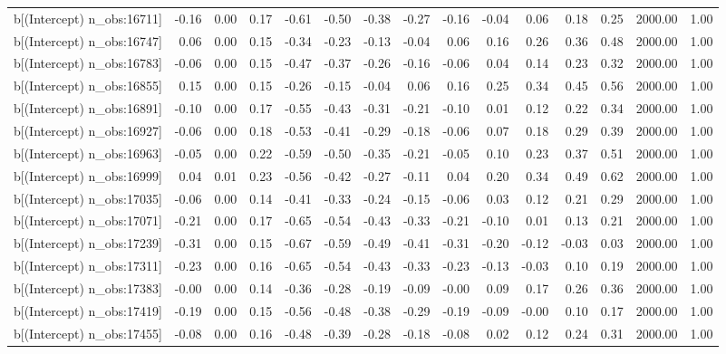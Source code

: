 \begin{table}[ht]
\begin{tabular}{rrrrrrrrrrrrrrr}
  b[(Intercept) n\_obs:16711] & -0.16 & 0.00 & 0.17 & -0.61 & -0.50 & -0.38 & -0.27 & -0.16 & -0.04 & 0.06 & 0.18 & 0.25 & 2000.00 & 1.00 \\ 
  b[(Intercept) n\_obs:16747] & 0.06 & 0.00 & 0.15 & -0.34 & -0.23 & -0.13 & -0.04 & 0.06 & 0.16 & 0.26 & 0.36 & 0.48 & 2000.00 & 1.00 \\ 
  b[(Intercept) n\_obs:16783] & -0.06 & 0.00 & 0.15 & -0.47 & -0.37 & -0.26 & -0.16 & -0.06 & 0.04 & 0.14 & 0.23 & 0.32 & 2000.00 & 1.00 \\ 
  b[(Intercept) n\_obs:16855] & 0.15 & 0.00 & 0.15 & -0.26 & -0.15 & -0.04 & 0.06 & 0.16 & 0.25 & 0.34 & 0.45 & 0.56 & 2000.00 & 1.00 \\ 
  b[(Intercept) n\_obs:16891] & -0.10 & 0.00 & 0.17 & -0.55 & -0.43 & -0.31 & -0.21 & -0.10 & 0.01 & 0.12 & 0.22 & 0.34 & 2000.00 & 1.00 \\ 
  b[(Intercept) n\_obs:16927] & -0.06 & 0.00 & 0.18 & -0.53 & -0.41 & -0.29 & -0.18 & -0.06 & 0.07 & 0.18 & 0.29 & 0.39 & 2000.00 & 1.00 \\ 
  b[(Intercept) n\_obs:16963] & -0.05 & 0.00 & 0.22 & -0.59 & -0.50 & -0.35 & -0.21 & -0.05 & 0.10 & 0.23 & 0.37 & 0.51 & 2000.00 & 1.00 \\ 
  b[(Intercept) n\_obs:16999] & 0.04 & 0.01 & 0.23 & -0.56 & -0.42 & -0.27 & -0.11 & 0.04 & 0.20 & 0.34 & 0.49 & 0.62 & 2000.00 & 1.00 \\ 
  b[(Intercept) n\_obs:17035] & -0.06 & 0.00 & 0.14 & -0.41 & -0.33 & -0.24 & -0.15 & -0.06 & 0.03 & 0.12 & 0.21 & 0.29 & 2000.00 & 1.00 \\ 
  b[(Intercept) n\_obs:17071] & -0.21 & 0.00 & 0.17 & -0.65 & -0.54 & -0.43 & -0.33 & -0.21 & -0.10 & 0.01 & 0.13 & 0.21 & 2000.00 & 1.00 \\ 
  b[(Intercept) n\_obs:17239] & -0.31 & 0.00 & 0.15 & -0.67 & -0.59 & -0.49 & -0.41 & -0.31 & -0.20 & -0.12 & -0.03 & 0.03 & 2000.00 & 1.00 \\ 
  b[(Intercept) n\_obs:17311] & -0.23 & 0.00 & 0.16 & -0.65 & -0.54 & -0.43 & -0.33 & -0.23 & -0.13 & -0.03 & 0.10 & 0.19 & 2000.00 & 1.00 \\ 
  b[(Intercept) n\_obs:17383] & -0.00 & 0.00 & 0.14 & -0.36 & -0.28 & -0.19 & -0.09 & -0.00 & 0.09 & 0.17 & 0.26 & 0.36 & 2000.00 & 1.00 \\ 
  b[(Intercept) n\_obs:17419] & -0.19 & 0.00 & 0.15 & -0.56 & -0.48 & -0.38 & -0.29 & -0.19 & -0.09 & -0.00 & 0.10 & 0.17 & 2000.00 & 1.00 \\ 
  b[(Intercept) n\_obs:17455] & -0.08 & 0.00 & 0.16 & -0.48 & -0.39 & -0.28 & -0.18 & -0.08 & 0.02 & 0.12 & 0.24 & 0.31 & 2000.00 & 1.00 \\ 

\end{tabular}
\end{table}
